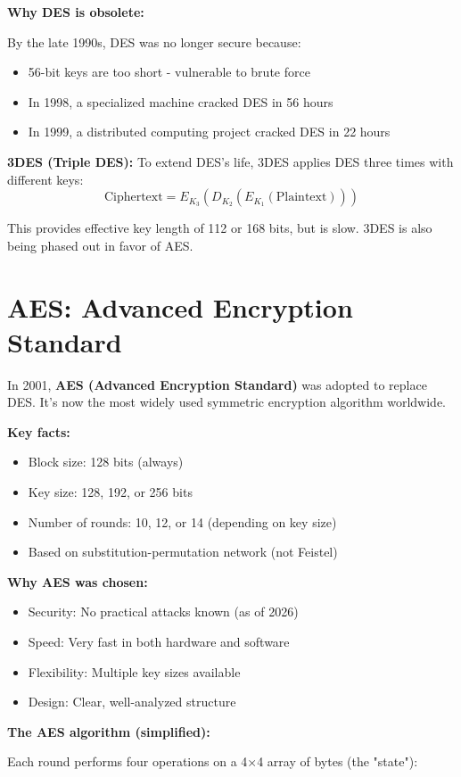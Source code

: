\documentclass[11pt,a4paper]{report}
\begin{document}
\textbf{Why DES is obsolete:}

By the late 1990s, DES was no longer secure because:
\begin{itemize}
\item 56-bit keys are too short - vulnerable to brute force
\item In 1998, a specialized machine cracked DES in 56 hours
\item In 1999, a distributed computing project cracked DES in 22 hours
\end{itemize}

\textbf{3DES (Triple DES):} To extend DES's life, 3DES applies DES three times with different keys:
\[ \text{Ciphertext} = E_{K_3}(D_{K_2}(E_{K_1}(\text{Plaintext}))) \]

This provides effective key length of 112 or 168 bits, but is slow. 3DES is also being phased out in favor of AES.

\section{AES: Advanced Encryption Standard}

In 2001, \textbf{AES (Advanced Encryption Standard)} was adopted to replace DES. It's now the most widely used symmetric encryption algorithm worldwide.

\textbf{Key facts:}
\begin{itemize}
\item Block size: 128 bits (always)
\item Key size: 128, 192, or 256 bits
\item Number of rounds: 10, 12, or 14 (depending on key size)
\item Based on substitution-permutation network (not Feistel)
\end{itemize}

\textbf{Why AES was chosen:}
\begin{itemize}
\item Security: No practical attacks known (as of 2026)
\item Speed: Very fast in both hardware and software
\item Flexibility: Multiple key sizes available
\item Design: Clear, well-analyzed structure
\end{itemize}

\textbf{The AES algorithm (simplified):}

Each round performs four operations on a 4×4 array of bytes (the "state"):
\end{document}
